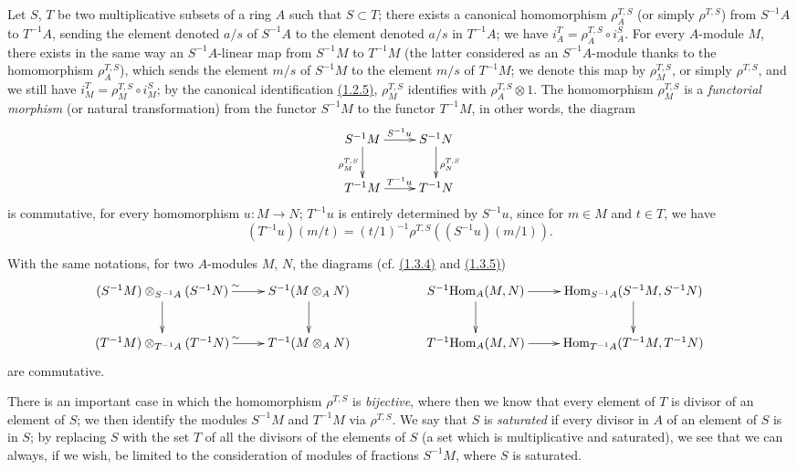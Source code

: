 \begin{env}[1.4.1]
\label{0.1.4.1}
Let $S$, $T$ be two multiplicative subsets of a ring $A$ such that $S\subset T$;
there exists a canonical homomorphism $\rho_A^{T,S}$ (or simply $\rho^{T,S}$)
from $S^{-1}A$ to $T^{-1}A$, sending the element denoted $a/s$ of $S^{-1}A$ to
the element denoted $a/s$ in $T^{-1}A$; we have $i_A^T=\rho_A^{T,S}\circ i_A^S$.
For every $A$-module $M$, there exists in the same way an $S^{-1}A$-linear map
from $S^{-1}M$ to $T^{-1}M$ (the latter considered as an $S^{-1}A$-module thanks
to the homomorphism $\rho_A^{T,S}$), which sends the element $m/s$ of $S^{-1}M$
to the element $m/s$ of $T^{-1}M$; we denote this map by $\rho_M^{T,S}$, or
simply $\rho^{T,S}$, and we still have $i_M^T=\rho_M^{T,S}\circ i_M^S$; by the
canonical identification \hyperref[0.1.2.5]{(1.2.5)}, $\rho_M^{T,S}$ identifies with
$\rho_A^{T,S}\otimes 1$. The homomorphism $\rho_M^{T,S}$ is a {\em functorial
morphism} (or natural transformation) from the functor $S^{-1}M$ to the functor
$T^{-1}M$, in other words, the diagram
\[
  \xymatrix{
  S^{-1}M\ar[r]^{S^{-1}u}\ar[d]_{\rho_M^{T,S}} &
  S^{-1}N\ar[d]^{\rho_N^{T,S}}\\
  T^{-1}M\ar[r]^{T^{-1}u} &
  T^{-1}N
  }
\]
is commutative, for every homomorphism $u:M\to N$; $T^{-1}u$ is entirely
determined by $S^{-1}u$, since for $m\in M$ and $t\in T$, we have
\[
  (T^{-1}u)(m/t)=(t/1)^{-1}\rho^{T,S}((S^{-1}u)(m/1)).
\]
\end{env}

\begin{env}[1.4.2]
\label{0.1.4.2}
With the same notations, for two $A$-modules $M$, $N$, the diagrams
(cf. \hyperref[0.1.3.4]{(1.3.4)} and \hyperref[0.1.3.5]{(1.3.5)})
\[
  \xymatrix{
    (S^{-1}M)\otimes_{S^{-1}A}(S^{-1}N)\ar[r]^\sim \ar[d] &
    S^{-1}(M\otimes_A N)\ar[d] & &
    S^{-1}\Hom_A(M,N)\ar[r]\ar[d] &
    \Hom_{S^{-1}A}(S^{-1}M,S^{-1}N)\ar[d]\\
    (T^{-1}M)\otimes_{T^{-1}A}(T^{-1}N)\ar[r]^\sim &
    T^{-1}(M\otimes_A N) & &
    T^{-1}\Hom_A(M,N)\ar[r] &
    \Hom_{T^{-1}A}(T^{-1}M,T^{-1}N)
  }
\]
are commutative.
\end{env}

\begin{env}[1.4.3]
\label{0.1.4.3}
There is an important case in which the homomorphism $\rho^{T,S}$ is
{\em bijective}, where then we know that every element of $T$ is divisor of an
element of $S$; we then identify the modules $S^{-1}M$ and $T^{-1}M$ via
$\rho^{T,S}$. We say that $S$ is {\em saturated} if every divisor in $A$ of an
element of $S$ is in $S$; by replacing $S$ with the set $T$ of all the divisors
of the elements of $S$ (a set which is multiplicative and saturated), we see
that we can always, if we wish, be limited to the consideration of modules of
fractions $S^{-1}M$, where $S$ is saturated.
\end{env}

